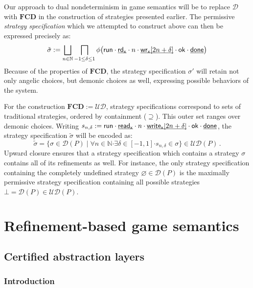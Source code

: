\documentclass[11pt,oneside,draft]{book}
\theoremstyle{definition}
\newcommand{\kw}[1]{\ensuremath{ \mathsf{#1} }}
\newcommand{\bdot}{\boldsymbol{\cdot}}
\newcommand{\ul}[1]{%
  \underline{\smash{#1}}
}
\begin{document}
Our approach to dual nondeterminism in game semantics
will be to replace $\mathcal{D}$ with $\mathbf{FCD}$
in the construction of strategies presented earlier. 
The permissive \emph{strategy specification}
which we attempted to construct above
can then be expressed precisely as:
\[
  \tilde{\sigma} :=
    \bigsqcup_{n \in \mathbb{N}}
    \bigsqcap_{-1 \le \delta \le 1}
    \phi \big(
        \kw{run} \cdot
        \ul{\kw{rd}_\kw{x}} \cdot n \cdot
        \ul{\kw{wr}_\kw{x}[2n + \delta]} \cdot \kw{ok} \cdot
        \ul{\kw{done}} \big)
\]
Because of the properties of $\mathbf{FCD}$,
the strategy specification $\sigma'$ will retain
not only angelic choices,
but demonic choices as well,
expressing possible behaviors
of the system.

For the construction $\mathbf{FCD} := \mathcal{U} \mathcal{D}$,
strategy specifications correspond to
sets of traditional strategies,
ordered by containment ($\supseteq$).
This outer set ranges over demonic choices.
Writing
$
  s_{n,\delta} :=
        \kw{run} \cdot
        \ul{\kw{read}_\kw{x}} \cdot n \cdot
        \ul{\kw{write}_\kw{x}[2n + \delta]} \cdot \kw{ok} \cdot
        \ul{\kw{done}} %
$,
the strategy specification $\tilde{\sigma}$
will be encoded as:
\[
  \tilde{\sigma} =
  \{ \sigma \in \mathcal{D}(P) \mid
     \forall n \in \mathbb{N} \bdot
     \exists \delta \in [-1,1] \bdot
     s_{n,\delta} \in \sigma \}
  \in \mathcal{UD}(P)
  \,.
\]
Upward closure ensures that a strategy specification
which contains a strategy $\sigma$
contains all of its refinements as well.
For instance,
the only strategy specification
containing the completely undefined strategy
$\varnothing \in \mathcal{D}(P)$
is the maximally permissive strategy specification
containing all possible strategies
$\bot = \mathcal{D}(P) \in \mathcal{UD}(P)$.




\part{Refinement-based game semantics} \label{part:rbgs}

\chapter{Certified abstraction layers} \label{sec:cal} %

\section{Introduction} %
\end{document}
